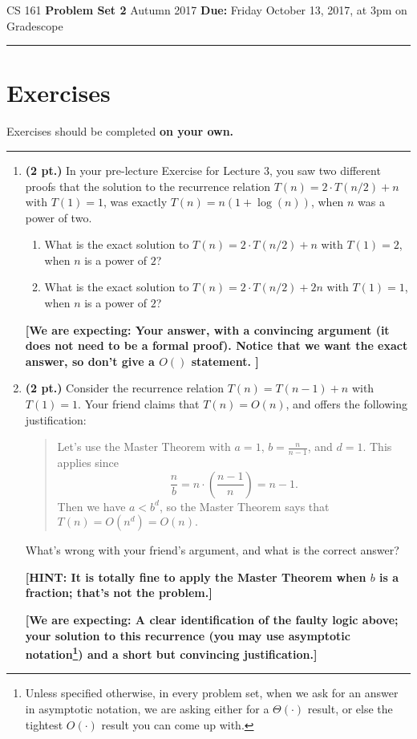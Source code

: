 \documentclass{article}
\newcommand{\expecting}[1]{\noindent\textbf{[We are expecting: #1]}}
\newcommand{\hint}[1]{\noindent\textbf{[HINT: #1]}}
\newcommand{\pts}[1]{\textbf{(#1 pt.)}}
\begin{document}
\noindent
CS 161 \hfill \textbf{Problem Set 2} \newline 
{Autumn 2017} \hfill \textbf{Due:} Friday October 13, 2017, at 3pm on Gradescope

\noindent
\rule{\linewidth}{0.4pt}

\section*{Exercises}
Exercises should be completed \textbf{on your own.}  

\noindent
\rule{\linewidth}{0.4pt}
\begin{enumerate}
\item\pts{2} In your pre-lecture Exercise for Lecture 3, you saw two different proofs that the solution to the recurrence relation $T(n) = 2\cdot T(n/2) + n$ with $T(1) = 1$, was exactly $T(n) = n(1 + \log(n))$, when $n$ was a power of two.
\begin{enumerate}
	\item What is the exact solution to $T(n) = 2 \cdot T(n/2) + n$ with $T(1) = 2$, when $n$ is a power of $2$?
	\item What is the exact solution to $T(n) = 2\cdot T(n/2) + 2n$ with $T(1) = 1$, when $n$ is a power of $2$?
\end{enumerate}
\expecting{ Your answer, with a convincing argument (it does not need to be a formal proof).  Notice that we want the exact answer, so don't give a $O()$ statement. }


\item\pts{2} Consider the recurrence relation $T(n) = T(n-1) + n$ with $T(1) = 1$.  Your friend claims that $T(n) = O(n)$, and offers the following justification:

\begin{quote}
Let's use the Master Theorem with $a = 1$, $b = \frac{n}{n-1}$, and $d = 1$.  
This applies since \[ \frac{n}{b} = n \cdot \left( \frac{n-1}{n} \right) = n-1. \]
Then we have $a < b^d$, so the Master Theorem says that
$T(n) = O(n^d) = O(n).$
\end{quote}

What's wrong with your friend's argument, and what is the correct answer?

\hint{It is totally fine to apply the Master Theorem when $b$ is a fraction; that's not the problem.}

\expecting{A clear identification of the faulty logic above; your solution to this recurrence (you may use asymptotic notation\footnote{Unless specified otherwise, in every problem set, when we ask for an answer in asymptotic notation, we are asking either for a $\Theta(\cdot)$ result, or else the tightest $O(\cdot)$ result you can come up with.}) and a short but convincing justification.}  



\end{enumerate}
\end{document}
